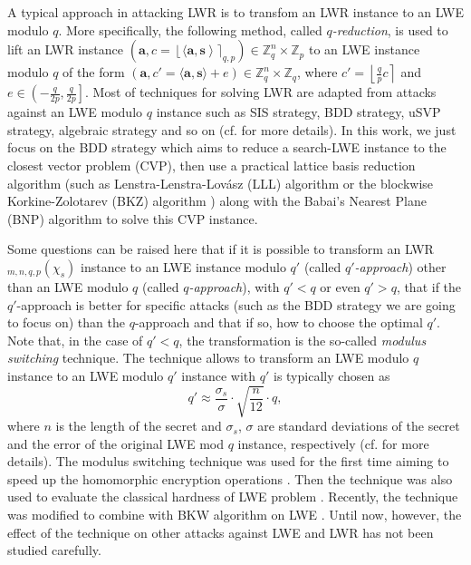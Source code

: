 \documentclass[runningheads]{llncs}
\begin{document}
A typical approach in attacking LWR is to transfom an LWR instance to an LWE modulo $q$. More specifically, the following method, called \textit{$q$-reduction}, is used to lift an LWR instance
$(\mathbf{a}, c=\left\lfloor \langle \mathbf{a}, \mathbf{s} \right \rangle \rceil_{q,p}) \in \mathbb{Z}_q^{n} \times \mathbb{Z}_p$ to an LWE instance modulo $q$ of the form $(\mathbf{a},c'=\langle \mathbf{a},\mathbf{s} \rangle+e) \in \mathbb{Z}_q^{n} \times \mathbb{Z}_q$, where
$c'=\left \lfloor \frac{q}{p}c \right \rceil $ and 
 $e \in \left( -\frac{q}{2p},\frac{q}{2p} \right]$. 
 Most of techniques for solving LWR are adapted from attacks against an LWE modulo $q$ instance  \cite{BBGM+17, CKLS16, DTV15} such as SIS strategy, BDD strategy, uSVP strategy, algebraic strategy \cite{AG11} and so on (cf. \cite{APS15} for more details). In this work, we just focus on the BDD strategy which aims to reduce a search-LWE instance to the closest vector problem (CVP),  then use a practical lattice basis reduction algorithm (such as Lenstra-Lenstra-Lov\'{a}sz (LLL) algorithm \cite{LLL82} or the blockwise Korkine-Zolotarev (BKZ) algorithm \cite{SE94}) along with the Babai's Nearest Plane (BNP) algorithm \cite{Bab86} to solve this CVP instance.

Some questions can be raised here that if it is possible to transform an LWR$_{m,n,q,p}(\chi_s)$ instance to an LWE instance modulo $q'$ (called \textit{$q'$-approach}) other than an LWE modulo $q$ (called \textit{$q$-approach}), with $q'<q$ or even $q'>q$, that if the $q'$-approach is better for specific attacks (such as the BDD strategy  we are going to focus on) than the $q$-approach and that if so, how to choose the optimal $q'$. Note that, in the case of $q'<q$, the transformation is the so-called \textit{modulus switching} technique. The technique allows to transform an LWE modulo $q$ instance to an LWE modulo $q'$ instance with $q'$ is typically chosen as
\begin{equation}\label{keye}
 q' \approx \frac{\sigma_s}{\sigma}\cdot \sqrt{\frac{n}{12}}\cdot q,
\end{equation} 
where $n$ is the length of the secret and $\sigma_{s}$,  $\sigma$ are standard deviations of the secret and the error of the original LWE mod $q$ instance, respectively (cf. \cite[Lemma 2]{APS15} for more details). 
The modulus switching technique was used for the first time aiming to speed up the homomorphic encryption operations \cite{BV11a}. Then the technique was also used to evaluate the classical  hardness of LWE problem \cite{BLP+13}. Recently, the technique was modified to combine with BKW algorithm on LWE \cite{AFFP14}. Until now, however, the effect of the technique on other attacks against LWE and LWR has not been studied carefully.
\end{document}
